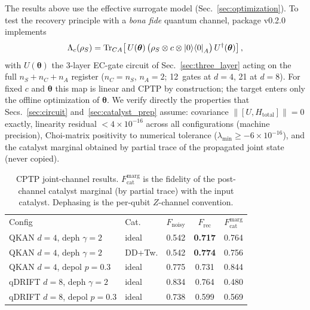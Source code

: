 \documentclass[pra,twocolumn,superscriptaddress,longbibliography,floatfix]{revtex4-2}
\begin{document}
The results above use the effective surrogate model (Sec.~\ref{sec:optimization}).
To test the recovery principle with a \emph{bona fide} quantum channel, package v0.2.0 implements
\begin{equation}
\Lambda_c(\rho_S) = \mathrm{Tr}_{CA}\!\left[\,U(\boldsymbol{\theta})\,
\bigl(\rho_S \otimes c \otimes \ket{0}\!\bra{0}_A\bigr)\,
U^\dagger(\boldsymbol{\theta})\right],
\label{eq:joint_channel}
\end{equation}
with $U(\boldsymbol{\theta})$ the 3-layer EC-gate circuit of Sec.~\ref{sec:three_layer} acting on the full $n_S + n_C + n_A$ register ($n_C = n_S$, $n_A = 2$; 12~gates at $d = 4$, 21 at $d = 8$).
For fixed $c$ and $\boldsymbol{\theta}$ this map is linear and CPTP by construction; the target enters only the offline optimization of $\boldsymbol{\theta}$.
We verify directly the properties that Secs.~\ref{sec:circuit} and~\ref{sec:catalyst_prep} assume: covariance $\|[U, H_\mathrm{total}]\| = 0$ exactly, linearity residual $< 4 \times 10^{-16}$ across all configurations (machine precision), Choi-matrix positivity to numerical tolerance ($\lambda_\mathrm{min} \geq -6 \times 10^{-16}$), and the catalyst marginal obtained by partial trace of the propagated joint state (never copied).

\begin{table}[!tbp]
\caption{CPTP joint-channel results. $F_\mathrm{cat}^\mathrm{marg}$ is the fidelity of the post-channel catalyst marginal (by partial trace) with the input catalyst. Dephasing is the per-qubit $Z$-channel convention.}
\label{tab:joint}
\centering\scriptsize
\setlength{\tabcolsep}{2.5pt}
\begin{ruledtabular}
\begin{tabular}{llccc}
Config & Cat. & $F_\mathrm{noisy}$ & $F_\mathrm{rec}$ & $F_\mathrm{cat}^\mathrm{marg}$ \\
\colrule
QKAN $d{=}4$, deph $\gamma{=}2$ & ideal & 0.542 & \textbf{0.717} & 0.764 \\
QKAN $d{=}4$, deph $\gamma{=}2$ & DD+Tw. & 0.542 & \textbf{0.774} & 0.756 \\
QKAN $d{=}4$, depol $p{=}0.3$ & ideal & 0.775 & 0.731 & 0.844 \\
qDRIFT $d{=}8$, deph $\gamma{=}2$ & ideal & 0.834 & 0.764 & 0.480 \\
qDRIFT $d{=}8$, depol $p{=}0.3$ & ideal & 0.738 & 0.599 & 0.569 \\
\end{tabular}
\end{ruledtabular}
\end{table}
\end{document}
